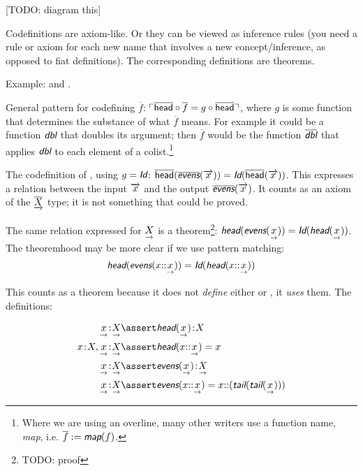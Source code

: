 \documentclass{article}
\begin{document}
[TODO: diagram this]


Codefinitions are axiom-like. Or they can be viewed as inference rules
(you need a rule or axiom for each new name that involves a new
concept/inference, as opposed to fiat definitions). The corresponding
definitions are theorems.

Example:  and .



\vspace{2ex}

General pattern for codefining \(\overline{f}\): \(\ulcorner
\overline{\textsf{head}}\circ\overline{f} = g\circ\overline{\textsf{head}}\urcorner\), where \(g\) is
some function that determines the substance of what \(\overline{f}\)
means. For example it could be a function \(\textsf{\slshape dbl}\)
that doubles its argument; then \(\overline{f}\) would be the function
\(\codefn{dbl}\) that applies \(\defn{dbl}\) to each element of a
colist.\footnote{Where we are using an overline, many other writers
use a function name, \textsf{\slshape map}, i.e. \(\overline{f} :=
\textsf{\slshape map}(f)\).}

\vspace{1ex}

The codefinition of , using \(g = \idfun\):
\(\cohead(\codefn{evens}(\coseq{x})) = \idfun(\cohead(\coseq{x}))\).
This expresses a relation between the input \(\overrightarrow{x}\) and the
output \(\codefn{evens}(\coseq{x})\). It counts as an axiom of the
\(\underrightarrow{\overline{X}}\) type; it is not something that could be proved.

The same relation expressed for \(\underset{\rightarrow}{X}\) is a theorem\footnote{TODO: proof}:
\(\head(\defn{evens}(\seq{x})) = \idfun(\head(\seq{x}))\). The theoremhood may be more clear if we use pattern matching:
\[\head(\defn{evens}(x\cons\seq{x})) = \idfun(\head(x\cons\seq{x}))\]

This counts as a theorem because it does not \textit{define} either
\head{} or , it \textit{uses} them. The definitions:

\begin{align}
 \tj{\seq{x}}{\List{X}} & \linfer \tj{\head(\seq{x})}{X} \\
 \tj{x}{X},\tj{\seq{x}}{\List{X}} & \linfer \head(x\cons\seq{x}) = x \\
 \tj{\seq{x}}{\List{X}} & \linfer \tj{\defn{evens}(\seq{x})}{\List{X}} \\
 \tj{\seq{x}}{\List{X}} & \linfer \defn{evens}(x\cons\seq{x})
   = x\cons(\tail(\tail(\seq{x})))
\end{align}
\end{document}
